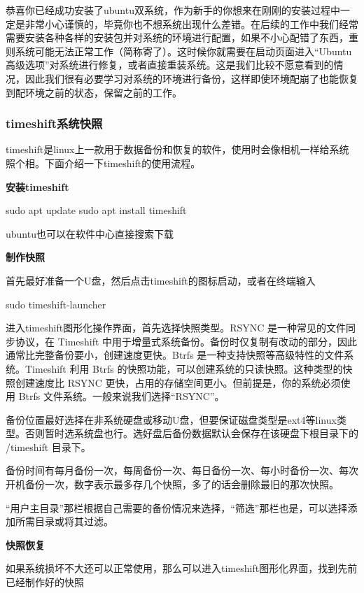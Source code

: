 恭喜你已经成功安装了ubuntu双系统，作为新手的你想来在刚刚的安装过程中一定是非常小心谨慎的，毕竟你也不想系统出现什么差错。在后续的工作中我们经常需要安装各种各样的安装包并对系统的环境进行配置，如果不小心配错了东西，重则系统可能无法正常工作（简称寄了）。这时候你就需要在启动页面进入“Ubuntu高级选项”对系统进行修复，或者直接重装系统。这是我们比较不愿意看到的情况，因此我们很有必要学习对系统的环境进行备份，这样即使环境配崩了也能恢复到配环境之前的状态，保留之前的工作。

\subsubsection{timeshift系统快照}

timeshift是linux上一款用于数据备份和恢复的软件，使用时会像相机一样给系统照个相。下面介绍一下timeshift的使用流程。

\textbf{安装timeshift}

\begin{tcode}
	sudo apt update
	sudo apt install timeshift
\end{tcode}

ubuntu也可以在软件中心直接搜索下载

\textbf{制作快照}

首先最好准备一个U盘，然后点击timeshift的图标启动，或者在终端输入

\begin{tcode}
	sudo timeshift-launcher
\end{tcode}

进入timeshift图形化操作界面，首先选择快照类型。RSYNC 是一种常见的文件同步协议，在 Timeshift 中用于增量式系统备份。备份时仅复制有改动的部分，因此通常比完整备份要小，创建速度更快。Btrfs 是一种支持快照等高级特性的文件系统。Timeshift 利用 Btrfs 的快照功能，可以创建系统的只读快照。这种类型的快照创建速度比 RSYNC 更快，占用的存储空间更小。但前提是，你的系统必须使用 Btrfs 文件系统。一般来说我们选择“RSYNC”。

备份位置最好选择在非系统硬盘或移动U盘，但要保证磁盘类型是ext4等linux类型。否则暂时选系统盘也行。选好盘后备份数据默认会保存在该硬盘下根目录下的 /timeshift 目录下。

备份时间有每月备份一次，每周备份一次、每日备份一次、每小时备份一次、每次开机备份一次，数字表示最多存几个快照，多了的话会删除最旧的那次快照。

“用户主目录”那栏根据自己需要的备份情况来选择，“筛选”那栏也是，可以选择添加所需目录或将其过滤。

\textbf{快照恢复}

如果系统损坏不大还可以正常使用，那么可以进入timeshift图形化界面，找到先前已经制作好的快照

